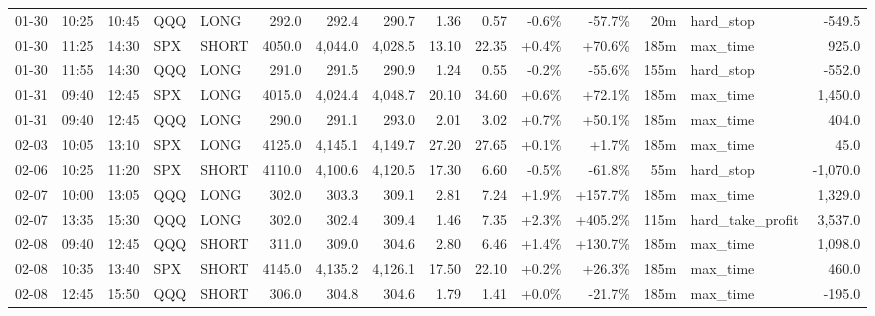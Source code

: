 \documentclass[11pt,a4paper,twoside]{article}
\begin{document}
\begin{landscape}
\begin{center}
\begin{longtable}{>{\color{txtmain}}l l l l l r r r r r r r r >{\color{txtmain}}l r}
01-30 & 10:25 & 10:45 & QQQ & LONG & 292.0 & 292.4 & 290.7 & 1.36 & 0.57 & \textcolor{lossred}{-0.6\%} & \textcolor{lossred}{-57.7\%} & 20m & hard\_stop & \textcolor{lossred}{-549.5} \\
01-30 & 11:25 & 14:30 & SPX & SHORT & 4050.0 & 4,044.0 & 4,028.5 & 13.10 & 22.35 & \textcolor{wingreen}{+0.4\%} & \textcolor{wingreen}{+70.6\%} & 185m & max\_time & \textcolor{wingreen}{925.0} \\
01-30 & 11:55 & 14:30 & QQQ & LONG & 291.0 & 291.5 & 290.9 & 1.24 & 0.55 & \textcolor{lossred}{-0.2\%} & \textcolor{lossred}{-55.6\%} & 155m & hard\_stop & \textcolor{lossred}{-552.0} \\
01-31 & 09:40 & 12:45 & SPX & LONG & 4015.0 & 4,024.4 & 4,048.7 & 20.10 & 34.60 & \textcolor{wingreen}{+0.6\%} & \textcolor{wingreen}{+72.1\%} & 185m & max\_time & \textcolor{wingreen}{1,450.0} \\
01-31 & 09:40 & 12:45 & QQQ & LONG & 290.0 & 291.1 & 293.0 & 2.01 & 3.02 & \textcolor{wingreen}{+0.7\%} & \textcolor{wingreen}{+50.1\%} & 185m & max\_time & \textcolor{wingreen}{404.0} \\
02-03 & 10:05 & 13:10 & SPX & LONG & 4125.0 & 4,145.1 & 4,149.7 & 27.20 & 27.65 & \textcolor{wingreen}{+0.1\%} & \textcolor{wingreen}{+1.7\%} & 185m & max\_time & \textcolor{wingreen}{45.0} \\
02-06 & 10:25 & 11:20 & SPX & SHORT & 4110.0 & 4,100.6 & 4,120.5 & 17.30 & 6.60 & \textcolor{lossred}{-0.5\%} & \textcolor{lossred}{-61.8\%} & 55m & hard\_stop & \textcolor{lossred}{-1,070.0} \\
02-07 & 10:00 & 13:05 & QQQ & LONG & 302.0 & 303.3 & 309.1 & 2.81 & 7.24 & \textcolor{wingreen}{+1.9\%} & \textcolor{wingreen}{+157.7\%} & 185m & max\_time & \textcolor{wingreen}{1,329.0} \\
02-07 & 13:35 & 15:30 & QQQ & LONG & 302.0 & 302.4 & 309.4 & 1.46 & 7.35 & \textcolor{wingreen}{+2.3\%} & \textcolor{wingreen}{+405.2\%} & 115m & hard\_take\_profit & \textcolor{wingreen}{3,537.0} \\
02-08 & 09:40 & 12:45 & QQQ & SHORT & 311.0 & 309.0 & 304.6 & 2.80 & 6.46 & \textcolor{wingreen}{+1.4\%} & \textcolor{wingreen}{+130.7\%} & 185m & max\_time & \textcolor{wingreen}{1,098.0} \\
02-08 & 10:35 & 13:40 & SPX & SHORT & 4145.0 & 4,135.2 & 4,126.1 & 17.50 & 22.10 & \textcolor{wingreen}{+0.2\%} & \textcolor{wingreen}{+26.3\%} & 185m & max\_time & \textcolor{wingreen}{460.0} \\
02-08 & 12:45 & 15:50 & QQQ & SHORT & 306.0 & 304.8 & 304.6 & 1.79 & 1.41 & \textcolor{wingreen}{+0.0\%} & \textcolor{lossred}{-21.7\%} & 185m & max\_time & \textcolor{lossred}{-195.0} \\

\end{longtable}
\end{center}
\end{landscape}
\end{document}
